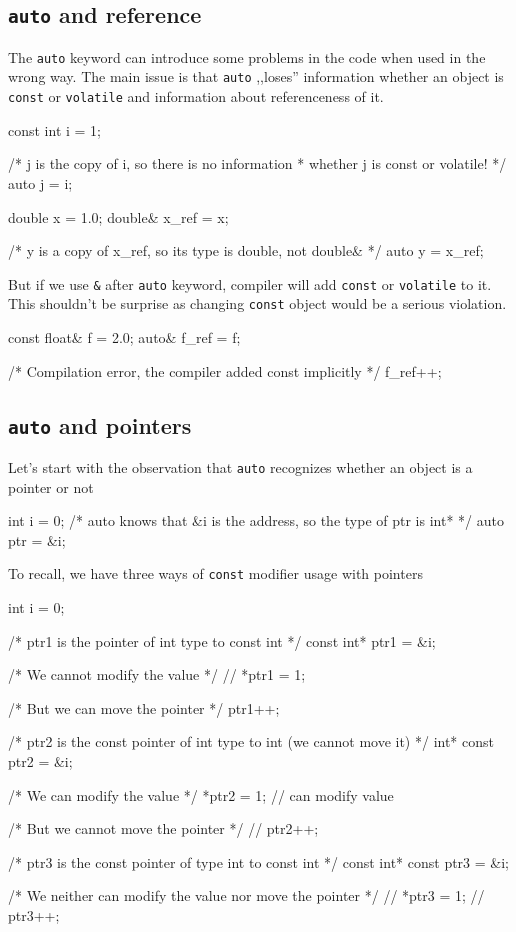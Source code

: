 \documentclass[../main]{subfiles}
\begin{document}
\subsection{\texttt{auto} and reference}
    The \texttt{auto} keyword can introduce some problems in the code when used in the wrong way. The main issue is that \texttt{auto} ,,loses'' information whether an object is \texttt{const} or \texttt{volatile}
and information about referenceness of it.

\begin{Code}
    const int i = 1;
    
    /* j is the copy of i, so there is no information
     * whether j is const or volatile!
     */
    auto j = i;

    double x = 1.0;
    double& x_ref = x;
    
    /* y is a copy of x_ref, so its type is double, not double& */
    auto y = x_ref;
\end{Code}
\noindent
But if we use \texttt{\&} after \texttt{auto} keyword, compiler will add \texttt{const} or \texttt{volatile} to it. This shouldn't be surprise
as changing \texttt{const} object would be a serious violation.
\begin{Code}
    const float& f = 2.0;
    auto& f_ref = f;
    
    /* Compilation error, the compiler added const implicitly */
    f_ref++;
\end{Code}

\subsection{\texttt{auto} and pointers} \label{Auto and pointers}
    Let's start with the observation that \texttt{auto} recognizes whether an object is a pointer or not
\begin{Code}
    int i = 0;
    /* auto knows that &i is the address, so the type of ptr is int* */
    auto ptr = &i;
\end{Code}

To recall, we have three ways of \texttt{const} modifier usage with pointers
\begin{Code}
    int i = 0;
    
    /* ptr1 is the pointer of int type to const int */
    const int* ptr1 = &i;

    /* We cannot modify the value */
    // *ptr1 = 1;

    /* But we can move the pointer */
    ptr1++;

    /* ptr2 is the const pointer of int type to int (we cannot move it) */
    int* const ptr2 = &i;

    /* We can modify the value */
    *ptr2 = 1;  // can modify value

    /* But we cannot move the pointer */
    // ptr2++;

    /* ptr3 is the const pointer of type int to const int */
    const int* const ptr3 = &i;

    /* We neither can modify the value nor move the pointer */
    // *ptr3 = 1;
    // ptr3++;
\end{Code}
\end{document}
